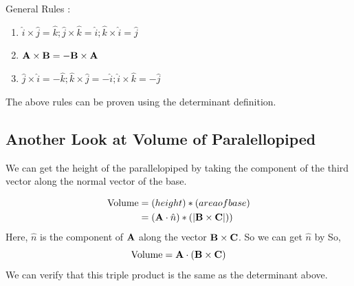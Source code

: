 General Rules :
\begin{enumerate}
	\item $\hat{i} \times \hat{j} = \hat{k}; \hat{j} \times \hat{k} = \hat{i}; \hat{k} \times \hat{i} = \hat{j}$
	\item ${\bf A} \times {\bf B} = - {\bf B} \times {\bf A}$
	\item $\hat{j} \times \hat{i} = - \hat{k}; \hat{k} \times \hat{j} = - \hat{i}; \hat{i} \times \hat{k} = - \hat{j}$
\end{enumerate}

The above rules can be proven using the determinant definition.

\subsection{Another Look at Volume of Paralellopiped}

We can get the height of the parallelopiped by taking the component of the third vector along the normal vector of the base.

\begin{align*}
\text{Volume} &= (height) * (area of base) \\
	& = ({\bf A} \cdot \hat{n}) * (|{\bf B} \times {\bf C}|) )
\end{align*}
Here, $\hat{n}$ is the component of ${\bf A}$ along the vector ${\bf B} \times {\bf C}$.
So we can get $\hat{n}$ by 
So, $$ \text{Volume} = {\bf A} \cdot ({\bf B} \times {\bf C}) $$
We can verify that this triple product is the same as the determinant above.